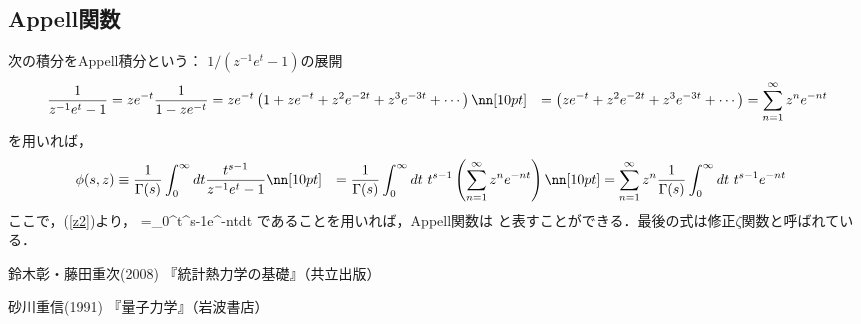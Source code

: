 \subsection{Appell関数}
次の積分をAppell積分という：
\be
{}
\ee
$1/(z^{-1}e^t-1)$の展開
\begin{align}
\dfrac{1}{z^{-1}e^t-1}&=ze^{-t}\frac{1}{1-ze^{-t}}=ze^{-t}\left(1+ze^{-t}+z^2e^{-2t}+z^3e^{-3t}+\cdots\right)\nn[10pt]
&=\left(ze^{-t}+z^2e^{-2t}+z^3e^{-3t}+\cdots\right)=\displaystyle\sum_{n=1}^{\infty}z^ne^{-nt}
\end{align}
を用いれば，
\begin{align}
\phi(s,z)&\equiv\dfrac{1}{\Gamma(s)}\displaystyle\int_0^\infty dt \dfrac{t^{s-1}}{z^{-1}e^t-1}\nn[10pt]
&=\dfrac{1}{\Gamma(s)}\displaystyle\int_0^\infty dt\ t^{s-1}\left(\displaystyle\sum_{n=1}^{\infty}z^ne^{-nt}\right)\nn[10pt]
%
&=\displaystyle\sum_{n=1}^{\infty}z^n\dfrac{1}{\Gamma(s)}\displaystyle\int_0^\infty dt\ t^{s-1}e^{-nt}
\end{align}
ここで，(\ref{z2})より，
\be
{}=\displaystyle\int_0^\infty t^{s-1}e^{-nt}dt
\ee
であることを用いれば，Appell関数は
\be
{}
\ee
と表すことができる．最後の式は修正$\zeta$関数と呼ばれている．
　\begin{thebibliography}{99}
\item
{鈴木彰・藤田重次(2008) 『統計熱力学の基礎』（共立出版）}
\item
{砂川重信(1991)
『量子力学』（岩波書店）}
\end{thebibliography}



